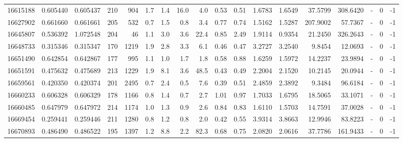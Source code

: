 \begin{tabular}{rrrrrrrrrrrrrrrlrr}
  16615188 & 0.605440 &   0.605437 &  210 &  904 &      1.7 &      1.4 &    16.0 &      4.0 &       0.53 &        0.51 &  1.6783 &  1.6549 &   37.5799 &  308.6420 &             - &        0 &         -1 \\
  16627902 & 0.661660 &   0.661661 &  205 &  532 &      0.7 &      1.5 &     0.8 &      3.4 &       0.77 &        0.74 &  1.5162 &  1.5287 &  207.9002 &   57.7367 &             - &        0 &         -1 \\
  16645807 & 0.536392 &   1.072548 &  204 &   46 &      1.1 &      3.0 &     3.6 &     22.4 &       0.85 &        2.49 &  1.9114 &  0.9354 &   21.2450 &  326.2643 &             - &        0 &         -1 \\
  16648733 & 0.315346 &   0.315347 &  170 & 1219 &      1.9 &      2.8 &     3.3 &      6.1 &       0.46 &        0.47 &  3.2727 &  3.2540 &    9.8454 &   12.0693 &             - &        0 &         -1 \\
  16651490 & 0.642854 &   0.642867 &  177 &  995 &      1.1 &      1.0 &     1.7 &      1.8 &       0.58 &        0.88 &  1.6259 &  1.5972 &   14.2237 &   23.9894 &             - &        0 &         -1 \\
  16651591 & 0.475632 &   0.475689 &  213 & 1229 &      1.9 &      8.1 &     3.6 &     48.5 &       0.43 &        0.49 &  2.2004 &  2.1520 &   10.2145 &   20.0944 &             - &        0 &         -1 \\
  16659561 & 0.420350 &   0.420374 &  201 & 2495 &      0.7 &      2.4 &     0.5 &      7.6 &       0.39 &        0.51 &  2.4859 &  2.3892 &    9.3484 &   96.6184 &             - &        0 &         -1 \\
  16660233 & 0.606328 &   0.606329 &  178 & 1166 &      0.8 &      1.4 &     0.7 &      2.7 &       1.01 &        0.97 &  1.7033 &  1.6795 &   18.5065 &   33.1071 &             - &        0 &         -1 \\
  16660485 & 0.647979 &   0.647972 &  214 & 1174 &      1.0 &      1.3 &     0.9 &      2.6 &       0.84 &        0.83 &  1.6110 &  1.5703 &   14.7591 &   37.0028 &             - &        0 &         -1 \\
  16669454 & 0.259441 &   0.259446 &  211 & 1280 &      0.8 &      1.2 &     0.8 &      2.0 &       0.42 &        0.55 &  3.9314 &  3.8663 &   12.9946 &   83.8223 &             - &        0 &         -1 \\
  16670893 & 0.486490 &   0.486522 &  195 & 1397 &      1.2 &      8.8 &     2.2 &     82.3 &       0.68 &        0.75 &  2.0820 &  2.0616 &   37.7786 &  161.9433 &             - &        0 &         -1 \\

\end{tabular}
